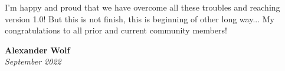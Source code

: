I'm happy and proud that we have overcome all these troubles and reaching version 1.0! But this is not finish, this is beginning of other long way... My congratulations to all prior and current community members!

\begin{flushright}
\textbf{Alexander Wolf} \\ \emph{September 2022}
\end{flushright}


